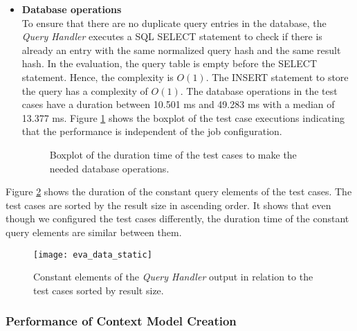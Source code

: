 \documentclass[draft,final]{vutinfth} %
\begin{document}
\begin{itemize}
	\item \textbf{Database operations} \\
	To ensure that there are no duplicate query entries in the database, the \textit{Query Handler} executes a SQL SELECT statement to check if there is already an entry with the same normalized query hash and the same result hash. In the evaluation, the query table is empty before the SELECT statement. Hence, the complexity is $O(1)$. The INSERT statement to store the query has a complexity of $O(1)$. The database operations in the test cases have a duration between 10.501 ms and 49.283 ms with a median of 13.377 ms. Figure \ref{fig:evaluation_perf_data_database} shows the boxplot of the test case executions indicating that the performance is independent of the job configuration.  
	\begin{figure}[!h]
		\centering
		\caption{Boxplot of the duration time of the test cases to make the needed database operations.}
		\label{fig:evaluation_perf_data_database}	
	\end{figure}
\end{itemize}

Figure \ref{fig:eva_data_static} shows the duration of the constant query elements of the test cases. The test cases are sorted by the result size in ascending order. It shows that even though we configured the test cases differently, the duration time of the constant query elements are similar between them. 

\begin{figure}[h]
	\centering
	\texttt{[image: eva\_data\_static]}
	\caption{Constant elements of the \textit{Query Handler} output in relation to the test cases sorted by result size.}
	\label{fig:eva_data_static} %
\end{figure}


\subsubsection{Performance of Context Model Creation}\label{Evaluation:impact_perf_context}
\end{document}

